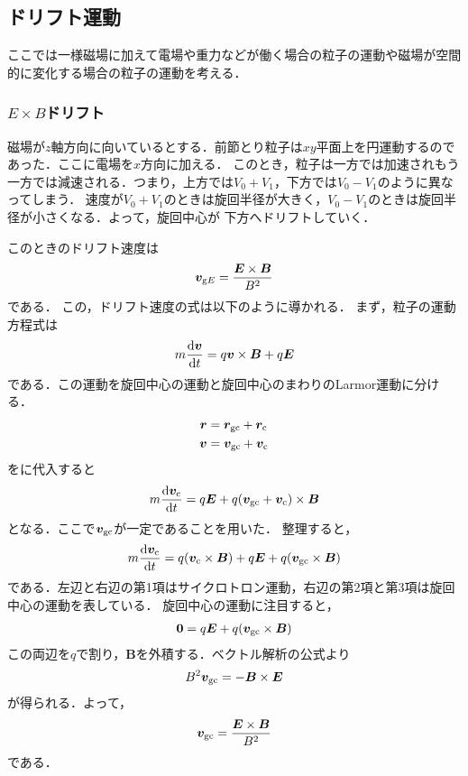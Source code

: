 \documentclass{report}
\begin{document}
    \subsection{ドリフト運動}
      ここでは一様磁場に加えて電場や重力などが働く場合の粒子の運動や磁場が空間的に変化する場合の粒子の運動を考える．
      \subsubsection{$E\times B$ドリフト}
        磁場が$z$軸方向に向いているとする．前節とり粒子は$xy$平面上を円運動するのであった．ここに電場を$x$方向に加える．
        このとき，粒子は一方では加速されもう一方では減速される．つまり，上方では$V_0+V_1$，下方では$V_0-V_1$のように異なってしまう．
        速度が$V_0+V_1$のときは旋回半径が大きく，$V_0-V_1$のときは旋回半径が小さくなる．よって，旋回中心が
        下方へドリフトしていく．
        \par
        このときのドリフト速度は
        \begin{align}
          \bm{v}_{\mathrm{g}E} = \frac{\bm{E}\times\bm{B}}{B^2} 
        \end{align}
        である．
        この，ドリフト速度の式は以下のように導かれる．
        まず，粒子の運動方程式は
        \begin{align}
          m\dv{\bm{v}}{t} = q\bm{v}\times\bm{B} + q\bm{E} \label{eom-cyclotron}
        \end{align}
        である．この運動を旋回中心の運動と旋回中心のまわりのLarmor運動に分ける．
        \begin{align}
          \bm{r} &= \bm{r}_{\mathrm{gc}} + \bm{r}_{\mathrm{c}} \\
          \bm{v} &= \bm{v}_{\mathrm{gc}} + \bm{v}_{\mathrm{c}} \label{drift-velocity}
        \end{align}
        をに代入すると
        \begin{align}
          m \dv{\bm{v}_{\mathrm{c}}}{t} = q\bm{E} + q(\bm{v}_{\mathrm{gc}} + \bm{v}_{\mathrm{c}})\times\bm{B}
        \end{align}
        となる．ここで$\bm{v}_{\mathrm{gc}}$が一定であることを用いた．
        整理すると，
        \begin{align}
          m \dv{\bm{v}_{\mathrm{c}}}{t} = q(\bm{v}_{\mathrm{c}} \times \bm{B}) + q\bm{E} + q(\bm{v}_{\mathrm{gc}}\times\bm{B})
        \end{align}
        である．左辺と右辺の第1項はサイクロトロン運動，右辺の第2項と第3項は旋回中心の運動を表している．
        旋回中心の運動に注目すると，
        \begin{align}
          \bm{0} = q\bm{E} + q(\bm{v}_{\mathrm{gc}}\times\bm{B})
        \end{align}
        この両辺を$q$で割り，$\bm{B}$を外積する．ベクトル解析の公式より
        \begin{align}
          B^2 \bm{v}_{\mathrm{gc}} = -\bm{B} \times \bm{E}
        \end{align}
        が得られる．よって，
        \begin{align}
          \bm{v}_{\mathrm{gc}} = \frac{\bm{E}\times\bm{B}}{B^2}
        \end{align}
        である．
\end{document}
